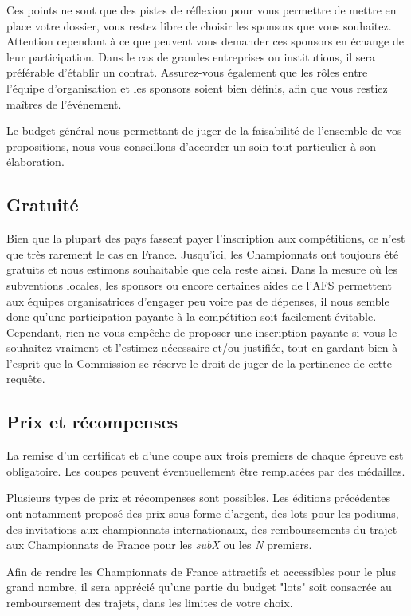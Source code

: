 \documentclass[a4paper,12pt]{scrartcl}
\begin{document}
Ces points ne sont que des pistes de réflexion pour vous permettre de mettre en place votre dossier, vous restez libre de choisir les sponsors que vous souhaitez. 
Attention cependant à ce que peuvent vous demander ces sponsors en échange de leur participation. Dans le cas de grandes entreprises ou institutions, il sera préférable d'établir un contrat. Assurez-vous également que les rôles entre l'équipe d'organisation et les sponsors soient bien définis, afin que vous restiez maîtres de l'événement.

Le budget général nous permettant de juger de la faisabilité de l'ensemble de vos propositions, nous vous conseillons d'accorder un soin tout particulier à son élaboration.


\subsection*{Gratuité}
Bien que la plupart des pays fassent payer l'inscription aux compétitions, ce n'est que très rarement le cas en France. Jusqu'ici, les Championnats ont toujours été gratuits et nous estimons souhaitable que cela reste ainsi. Dans la mesure où les subventions locales, les sponsors ou encore certaines aides de l'AFS permettent aux équipes organisatrices d'engager peu voire pas de dépenses, il nous semble donc qu'une participation payante à la compétition soit facilement évitable. Cependant, rien ne vous empêche de proposer une inscription payante si vous le souhaitez vraiment et l'estimez nécessaire et/ou justifiée, tout en gardant bien à l'esprit que la Commission se réserve le droit de juger de la pertinence de cette requête.


\subsection*{Prix et récompenses}
La remise d'un certificat et d'une coupe aux trois premiers de chaque épreuve est obligatoire. Les coupes peuvent éventuellement être remplacées par des médailles.

Plusieurs types de prix et récompenses sont possibles. Les éditions précédentes ont notamment proposé des prix sous forme d'argent, des lots pour les podiums, des invitations aux championnats internationaux, des remboursements du trajet aux Championnats de France pour les \emph{subX} ou les \emph{N} premiers.

Afin de rendre les Championnats de France attractifs et accessibles pour le plus grand nombre, il sera apprécié qu'une partie du budget "lots" soit consacrée au remboursement des trajets, dans les limites de votre choix.
\end{document}
